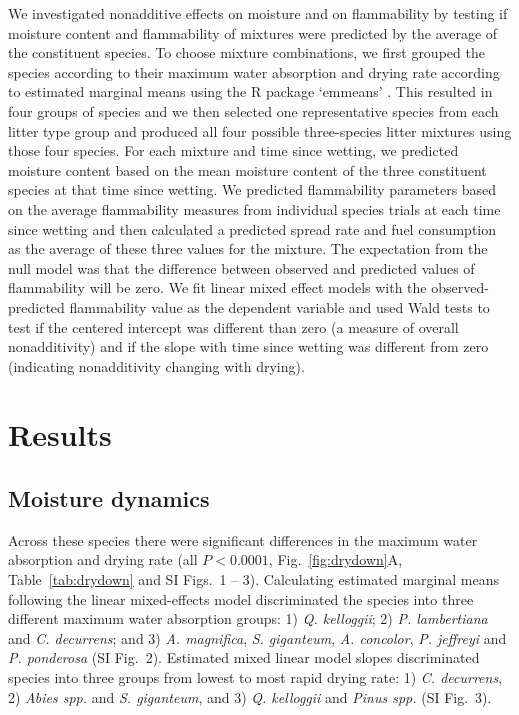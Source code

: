 \documentclass[letterpaper,12pt]{article}
\begin{document}
We investigated nonadditive effects on moisture and on flammability by
testing if moisture content and flammability of mixtures were predicted by the
average of the constituent species. To choose mixture combinations, we first
grouped the species according to their maximum water absorption and drying rate
according to estimated marginal means using the R package `emmeans'
\citep{Lenth-2019}. This resulted in four groups of species and we then
selected one representative species from each litter type group and produced
all four possible three-species litter mixtures using those four species. For
each mixture and time since wetting, we predicted moisture content based on the
mean moisture content of the three constituent species at that time since
wetting. We predicted flammability parameters based on the average flammability
measures from individual species trials at each time since wetting and then
calculated a predicted spread rate and fuel consumption as the average of these
three values for the mixture. The expectation from the null model was that the
difference between observed and predicted values of flammability will be zero.
We fit linear mixed effect models with the observed-predicted flammability
value as the dependent variable and used Wald tests to test if the centered
intercept was different than zero (a measure of overall nonadditivity) and if
the slope with time since wetting was different from zero (indicating
nonadditivity changing with drying).

\section*{Results}

\subsection*{Moisture dynamics}

Across these species there were significant differences in the maximum water
absorption and drying rate (all $P < 0.0001$, Fig.~\ref{fig:drydown}A,
Table~\ref{tab:drydown} and SI Figs.~1 -- 3). Calculating estimated marginal
means following the linear mixed-effects model discriminated the species into
three different maximum water absorption groups: 1) \emph{Q. kelloggii}; 2)
\emph{P. lambertiana} and \emph{C. decurrens}; and 3) \emph{A. magnifica},
\emph{S. giganteum}, \emph{A. concolor}, \emph{P. jeffreyi} and \emph{P.
  ponderosa} (SI Fig.~2). Estimated mixed linear model slopes discriminated
species into three groups from lowest to most rapid drying rate: 1) \emph{C.
  decurrens}, 2) \emph{Abies spp.} and \emph{S. giganteum}, and 3) \emph{Q.
  kelloggii} and \emph{Pinus spp.} (SI Fig.~3).
\end{document}
